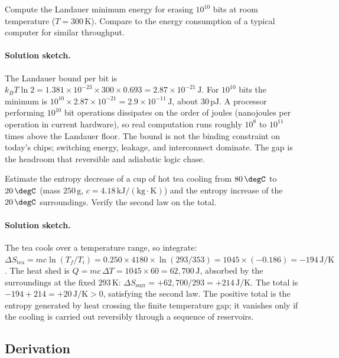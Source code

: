 \begin{exercise}
Compute the Landauer minimum energy for erasing $10^{10}$ bits at
room temperature ($T = 300\,\si{\kelvin}$). Compare to the energy
consumption of a typical computer for similar throughput.

\paragraph{Solution sketch.} The Landauer bound per bit is
$k_B T \ln 2 = 1.381 \times 10^{-23} \times 300 \times 0.693 =
2.87 \times 10^{-21}\,\text{J}$. For $10^{10}$ bits the minimum is
$10^{10} \times 2.87 \times 10^{-21} = 2.9 \times 10^{-11}\,\text{J}$,
about $30\,\text{pJ}$. A processor performing $10^{10}$ bit operations
dissipates on the order of joules (nanojoules per operation in current
hardware), so real computation runs roughly $10^{8}$ to $10^{11}$ times
above the Landauer floor. The bound is not the binding constraint on
today's chips; switching energy, leakage, and interconnect dominate.
The gap is the headroom that reversible and adiabatic logic chase.
\end{exercise}

\begin{exercise}
Estimate the entropy decrease of a cup of hot tea cooling from
$80\,\degC$ to $20\,\degC$ (mass $250\,\text{g}$, $c = 4.18\,\text{kJ}
/(\text{kg}\cdot\si{\kelvin})$) and the entropy increase of the
$20\,\degC$ surroundings. Verify the second law on the total.

\paragraph{Solution sketch.} The tea cools over a temperature range,
so integrate: $\Delta S_{\text{tea}} = mc \ln(T_f/T_i) =
0.250 \times 4180 \times \ln(293/353) = 1045 \times (-0.186) =
-194\,\si{\joule\per\kelvin}$. The heat shed is
$Q = mc\,\Delta T = 1045 \times 60 = 62{,}700\,\text{J}$, absorbed by
the surroundings at the fixed $293\,\si{\kelvin}$:
$\Delta S_{\text{surr}} = +62{,}700/293 = +214\,\si{\joule\per\kelvin}$.
The total is $-194 + 214 = +20\,\si{\joule\per\kelvin} > 0$, satisfying
the second law. The positive total is the entropy generated by heat
crossing the finite temperature gap; it vanishes only if the cooling is
carried out reversibly through a sequence of reservoirs.
\end{exercise}

\subsection*{Derivation}

